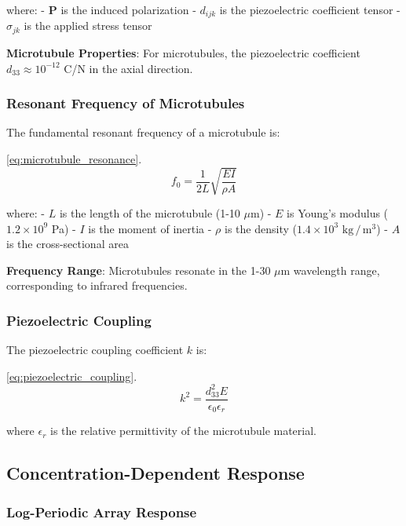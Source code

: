 \documentclass[
  13pt,
  a4paperpaper,
  12pt]{article}
\begin{document}
where: - \(\mathbf{P}\) is the induced polarization - \(d_{ijk}\) is the
piezoelectric coefficient tensor - \(\sigma_{jk}\) is the applied stress
tensor

\textbf{Microtubule Properties}: For microtubules, the piezoelectric
coefficient \(d_{33} \approx 10^{-12}\) C/N in the axial direction.

\subsubsection{Resonant Frequency of
Microtubules}\label{resonant-frequency-of-microtubules}

The fundamental resonant frequency of a microtubule is:

\eqref{eq:microtubule_resonance}. \begin{equation}
f_0 = \frac{1}{2L} \sqrt{\frac{EI}{\rho A}} \label{eq:microtubule_resonance}
\end{equation}

where: - \(L\) is the length of the microtubule (1-10 \(\mu\mathrm{m}\))
- \(E\) is Young's modulus (\(1.2 \times 10^9\) Pa) - \(I\) is the
moment of inertia - \(\rho\) is the density (\(1.4 \times 10^3\)
\(\mathrm{kg}\,/\,\mathrm{m}^3\)) - \(A\) is the cross-sectional area

\textbf{Frequency Range}: Microtubules resonate in the 1-30
\(\mu\mathrm{m}\) wavelength range, corresponding to infrared
frequencies.

\subsubsection{Piezoelectric Coupling}\label{piezoelectric-coupling}

The piezoelectric coupling coefficient \(k\) is:

\eqref{eq:piezoelectric_coupling}. \begin{equation}
k^2 = \frac{d_{33}^2 E}{\epsilon_0 \epsilon_r} \label{eq:piezoelectric_coupling}
\end{equation}

where \(\epsilon_r\) is the relative permittivity of the microtubule
material.

\subsection{Concentration-Dependent
Response}\label{concentration-dependent-response}

\subsubsection{Log-Periodic Array
Response}\label{log-periodic-array-response}
\end{document}
